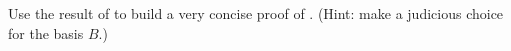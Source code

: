 Use the result of  to build a very concise proof of .  (Hint: make a judicious choice for the basis $B$.)